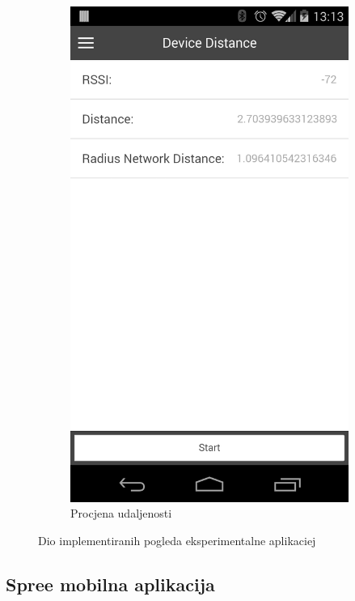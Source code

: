 \begin{figure}[H]
\begin{subfigure}[b]{0.45\textwidth}
        \includegraphics[scale=0.15]{pictures/experimental4}
        \caption{Procjena udaljenosti}
        \label{fig:exp4}
    \end{subfigure}
    
    \caption{Dio implementiranih pogleda eksperimentalne aplikaciej}
\end{figure}

\subsection{Spree mobilna aplikacija}

